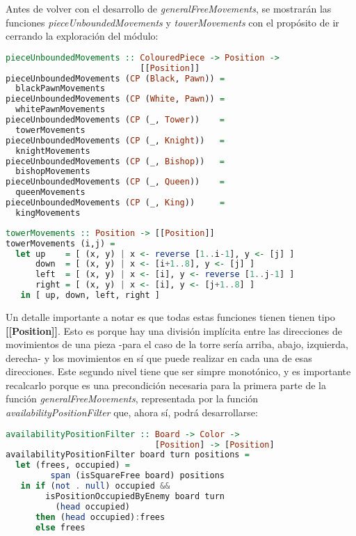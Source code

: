 \documentclass{llncs}
\begin{document}
Antes de volver con el desarrollo de \textit{generalFreeMovements}, se mostrarán las funciones \textit{pieceUnboundedMovements} y \textit{towerMovements} con el propósito de ir cerrando la exploración del módulo:

\begin{lstlisting}[frame=single, language=haskell, captionpos=b, caption=Función pieceUnboundedMovements, label={lst:piece_unbounded_movements}]
pieceUnboundedMovements :: ColouredPiece -> Position ->
                           [[Position]]
pieceUnboundedMovements (CP (Black, Pawn)) =
  blackPawnMovements
pieceUnboundedMovements (CP (White, Pawn)) =
  whitePawnMovements
pieceUnboundedMovements (CP (_, Tower))    =
  towerMovements
pieceUnboundedMovements (CP (_, Knight))   =
  knightMovements
pieceUnboundedMovements (CP (_, Bishop))   =
  bishopMovements
pieceUnboundedMovements (CP (_, Queen))    =
  queenMovements
pieceUnboundedMovements (CP (_, King))     =
  kingMovements
\end{lstlisting}

\begin{lstlisting}[frame=single, language=haskell, captionpos=b, caption=Función towerMovements, label={lst:tower_movements}]
towerMovements :: Position -> [[Position]]
towerMovements (i,j) =
  let up    = [ (x, y) | x <- reverse [1..i-1], y <- [j] ]
      down  = [ (x, y) | x <- [i+1..8], y <- [j] ]
      left  = [ (x, y) | x <- [i], y <- reverse [1..j-1] ]
      right = [ (x, y) | x <- [i], y <- [j+1..8] ]
   in [ up, down, left, right ]
\end{lstlisting}

Un detalle importante a notar es que todas estas funciones tienen tienen tipo \textbf{[[Position]]}. Esto es porque hay una división implícita entre las direcciones de movimientos de una pieza -para el caso de la torre sería arriba, abajo, izquierda, derecha- y los movimientos en sí que puede realizar en cada una de esas direcciones. Este segundo nivel tiene que ser simpre monotónico, y es importante recalcarlo porque es una precondición necesaria para la primera parte de la función \textit{generalFreeMovements}, representada por la función \textit{availabilityPositionFilter} que, ahora sí, podrá desarrollarse:


\begin{lstlisting}[frame=single, language=haskell, captionpos=b, caption=Función availabilityPositionFilter, label={lst:availability_position_filter}]
availabilityPositionFilter :: Board -> Color ->
                              [Position] -> [Position]
availabilityPositionFilter board turn positions =
  let (frees, occupied) =
         span (isSquareFree board) positions
   in if (not . null) occupied &&
        isPositionOccupiedByEnemy board turn
          (head occupied)
      then (head occupied):frees
      else frees
\end{lstlisting}
\end{document}
